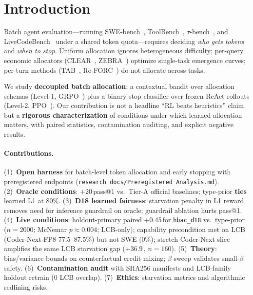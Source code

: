 \documentclass[11pt,letterpaper]{article}
\makeatletter
\newcommand{\passat}[1]{pass@#1}
\newcommand{\pp}{\,\text{pp}}
\makeatother
\begin{document}
\section{Introduction}
\label{sec:intro}

Batch agent evaluation---running SWE-bench~\citep{jimenez2024swebench}, ToolBench~\citep{qin2023toolllm}, $\tau$-bench~\citep{yao2025taubench}, and LiveCodeBench~\citep{jain2024livecodebench} under a shared token quota---requires deciding \emph{who gets tokens} and \emph{when to stop}.
Uniform allocation ignores heterogeneous difficulty; per-query economic allocators (CLEAR~\citep{wan2026clear}, ZEBRA~\citep{hamri2026zebra}) optimize single-task emergence curves; per-turn methods (TAB~\citep{jali2026tab}, Re-FORC~\citep{zabounidis2025reforc}) do not allocate across tasks.

We study \textbf{decoupled batch allocation}: a contextual bandit over allocation schemas (Level-1, GRPO~\citep{shao2024grpo}) plus a binary stop classifier over frozen ReAct rollouts (Level-2, PPO~\citep{schulman2017ppo}).
Our contribution is not a headline ``RL beats heuristics'' claim but a \textbf{rigorous characterization} of conditions under which learned allocation matters, with paired statistics, contamination auditing, and explicit negative results.

\paragraph{Contributions.}
(1)~\textbf{Open harness} for batch-level token allocation and early stopping with preregistered endpoints (\texttt{research docs/Preregistered Analysis.md}).
(2)~\textbf{Oracle conditions}: +20\pp \passat{1} vs.\ Tier-A official baselines; type-prior \textbf{ties} learned L1 at 80\%.
(3)~\textbf{D18 learned fairness}: starvation penalty in L1 reward removes need for inference guardrail on oracle; guardrail ablation hurts \passat{1}.
(4)~\textbf{Live conditions}: holdout-primary paired +0.45\pp for \texttt{hbac\_d18} vs.\ type-prior ($n{=}2000$; McNemar $p{\approx}0.004$; LCB-only); capability precondition met on LCB (Coder-Next-FP8 77.5--87.5\%) but not SWE (0\%); stretch Coder-Next slice amplifies the same LCB starvation gap (+36.9\pp, $n{=}160$).
(5)~\textbf{Theory}: bias/variance bounds on counterfactual credit mixing; $\beta$ sweep validates small-$\beta$ safety.
(6)~\textbf{Contamination audit} with SHA256 manifests and LCB-family holdout retrain (0 LCB overlap).
(7)~\textbf{Ethics}: starvation metrics and algorithmic redlining risks.
\end{document}
